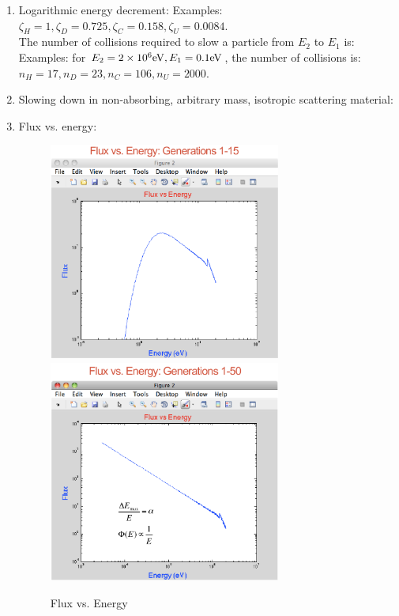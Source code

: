 \documentclass{school-22.211-notes}
\begin{document}
\begin{enumerate}
\item Logarithmic energy decrement: 
Examples: $\zeta_{H} = 1, \zeta_D = 0.725, \zeta_C = 0.158, \zeta_U = 0.0084$.  \\
 The number of collisions required to slow a particle from $E_2$ to $E_1$ is: 
Examples: for $E_2 = 2\times 10^6 \mathrm{eV}, E_1 = 0.1 \mathrm{eV}$, the number of collisions is: $n_H = 17, n_D = 23, n_C = 106, n_U = 2000$. 


\item Slowing down in non-absorbing, arbitrary mass, isotropic scattering material: 


\item Flux vs. energy:
\begin{figure}[ht]
  \centering
  \includegraphics[width=3in]{images/sl-d/flux-vs-energy-1.png}
  \includegraphics[width=3in]{images/sl-d/flux-vs-energy-2.png}
  \caption{Flux vs. Energy} \label{fve}
\end{figure}


\end{enumerate}
\end{document}
